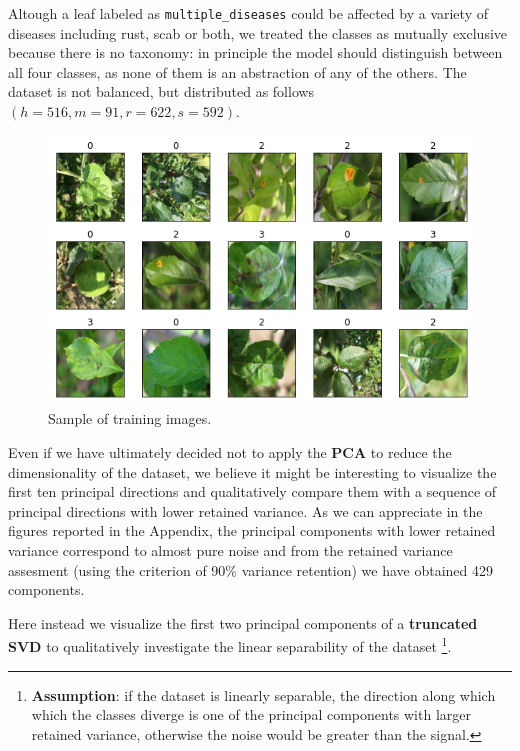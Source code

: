 \documentclass[aps,twocolumn,secnumarabic,nobalancelastpage,amsmath,amssymb,
nofootinbib]{revtex4}
\begin{document}
Altough a leaf labeled as \texttt{multiple\_diseases} could be affected
by a variety of diseases including rust, scab or both, we treated the
classes as mutually exclusive because there is no taxonomy: in principle
the model should distinguish between all four classes, as none of them
is an abstraction of any of the others. The dataset is not balanced, but
distributed as follows \((h = 516, m = 91, r = 622, s = 592)\).

\begin{figure}[h]
	\centering
	\includegraphics[width=0.9\linewidth]{Images/InputImages}
	\caption{Sample of training images.}
	\label{fig:inputimages}
\end{figure}


Even if we have ultimately decided not to apply the \textbf{PCA} to
reduce the dimensionality of the dataset, we believe it might be
interesting to visualize the first ten principal directions and
qualitatively compare them with a sequence of principal directions with
lower retained variance. As we can appreciate in the figures reported in
the Appendix, the principal components with
lower retained variance correspond to almost pure noise and from the
retained variance assesment (using the criterion of 90\% variance
retention) we have obtained 429 components.

Here instead we visualize the first two principal components of a
\textbf{truncated SVD} to qualitatively investigate the linear
separability of the dataset \footnote{\textbf{Assumption}: if the
	dataset is linearly separable, the direction along which which the
	classes diverge is one of the principal components with larger
	retained variance, otherwise the noise would be greater than the
	signal.}.
\end{document}

